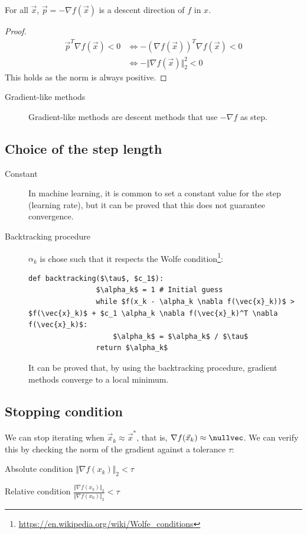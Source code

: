 \begin{theorem}
    For all $\vec{x}$, $\vec{p} = -\nabla f(\vec{x})$ is a descent direction of $f$ in $x$.
\end{theorem}
\begin{proof}
    \[
        \begin{split}
            \vec{p}^T \nabla f(\vec{x}) < 0 &\iff -(\nabla f(\vec{x}))^T \nabla f(\vec{x}) < 0 \\
                &\iff - \Vert \nabla f(\vec{x}) \Vert_2^2 < 0
        \end{split}
    \]
    This holds as the norm is always positive.
\end{proof}

\begin{description}
    \item[Gradient-like methods] 
        Gradient-like methods are descent methods that use $-\nabla f$ as step.
\end{description}


\subsection{Choice of the step length}
\begin{description}
    \item[Constant] 
        In machine learning, it is common to set a constant value for the step (learning rate), 
        but it can be proved that this does not guarantee convergence.
    
    \item[Backtracking procedure] 
        $\alpha_k$ is chose such that it respects the Wolfe condition\footnote{\url{https://en.wikipedia.org/wiki/Wolfe_conditions}}:
        \begin{lstlisting}[mathescape=true]
            def backtracking($\tau$, $c_1$):
                $\alpha_k$ = 1 # Initial guess
                while $f(x_k - \alpha_k \nabla f(\vec{x}_k))$ > $f(\vec{x}_k)$ + $c_1 \alpha_k \nabla f(\vec{x}_k)^T \nabla f(\vec{x}_k)$:
                    $\alpha_k$ = $\alpha_k$ / $\tau$
                return $\alpha_k$
        \end{lstlisting}
        It can be proved that, by using the backtracking procedure, gradient methods converge to a local minimum.
\end{description}


\subsection{Stopping condition}
We can stop iterating when $\vec{x}_k \approx \vec{x}^*$, that is, $\nabla f(\vec{x}_k) \approx \nullvec$.
We can verify this by checking the norm of the gradient against a tolerance $\tau$:
\begin{descriptionlist}
    \item[Absolute condition] $\Vert \nabla f(x_k) \Vert_2 < \tau$ 
    \item[Relative condition] $\frac{\Vert \nabla f(x_k) \Vert_2}{\Vert \nabla f(x_0) \Vert_2} < \tau$ 
\end{descriptionlist}

